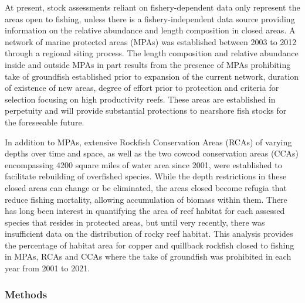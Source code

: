 \documentclass[11pt,
  english,
  a4paper,
]{article}
\begin{document}

At present, stock assessments reliant on fishery-dependent data only represent the areas open to fishing, unless there is a fishery-independent data source providing information on the relative abundance and length composition in closed areas. A network of marine protected areas (MPAs) was established between 2003 to 2012 through a regional siting process. The length composition and relative abundance inside and outside MPAs in part results from the presence of MPAs prohibiting take of groundfish established prior to expansion of the current network, duration of existence of new areas, degree of effort prior to protection and criteria for selection focusing on high productivity reefs. These areas are established in perpetuity and will provide substantial protections to nearshore fish stocks for the foreseeable future.

\leavevmode\tagmcend\tagstructend\par


In addition to MPAs, extensive Rockfish Conservation Areas (RCAs) of varying depths over time and space, as well as the two cowcod conservation areas (CCAs) encompassing 4200 square miles of water area since 2001, were established to facilitate rebuilding of overfished species. While the depth restrictions in these closed areas can change or be eliminated, the areas closed become refugia that reduce fishing mortality, allowing accumulation of biomass within them. There has long been interest in quantifying the area of reef habitat for each assessed species that resides in protected areas, but until very recently, there was insufficient data on the distribution of rocky reef habitat. This analysis provides the percentage of habitat area for copper and quillback rockfish closed to fishing in MPAs, RCAs and CCAs where the take of groundfish was prohibited in each year from 2001 to 2021.

\leavevmode\tagmcend\tagstructend\par


\hypertarget{methods}{%
\subsubsection{Methods}\label{methods}}

\leavevmode\tagmcend\tagstructend
\end{document}
